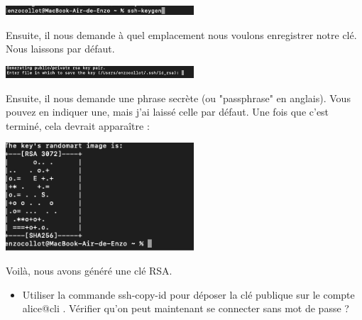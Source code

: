 \documentclass[12pt]{article}
\begin{document}
\vspace{0.3cm}

\begin{center}
  \includegraphics[width=7cm]{Images-Client-SSH/Image-TD-SSH-2/ssh-keygen.png}
\end{center}

\vspace{0.3cm}

Ensuite, il nous demande à quel emplacement nous voulons enregistrer notre clé. Nous laissons par défaut.

\vspace{0.3cm}

\begin{center}
  \includegraphics[width=7cm]{Images-Client-SSH/Image-TD-SSH-2/Emplacement-cle.png}
\end{center}

\vspace{0.3cm}

\newpage


Ensuite, il nous demande une phrase secrète (ou "passphrase" en anglais). Vous pouvez en indiquer une, mais j'ai laissé celle par défaut. Une fois que c'est terminé, cela devrait apparaître :

\vspace{0.3cm}

\begin{center}
  \includegraphics[width=7cm]{Images-Client-SSH/Image-TD-SSH-2/Génération-cle.png}
\end{center}

\vspace{0.3cm}

Voilà, nous avons généré une clé RSA.

\vspace{0.3cm}

\begin{itemize}
  \item Utiliser la commande ssh-copy-id pour déposer la clé publique sur le compte alice@cli . Vérifier qu'on peut maintenant se connecter sans mot de passe ?
\end{itemize}
\end{document}
